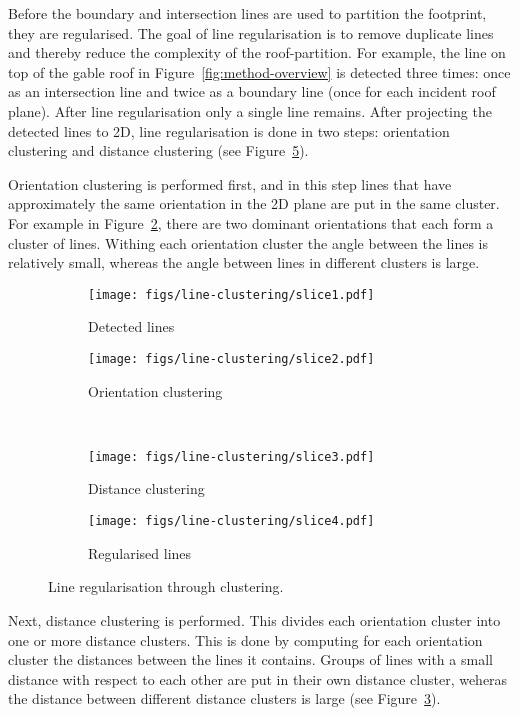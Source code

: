 Before the boundary and intersection lines are used to partition the footprint, they are regularised.
The goal of line regularisation is to remove duplicate lines and thereby reduce the complexity of the roof-partition.
For example, the line on top of the gable roof in Figure~\ref{fig:method-overview} is detected three times: once as an intersection line and twice as a boundary line (once for each incident roof plane).
After line regularisation only a single line remains.
After projecting the detected lines to 2D, line regularisation is done in two steps: orientation clustering and distance clustering (see Figure~\ref{fig:lineclust}).

Orientation clustering is performed first, and in this step lines that have approximately the same orientation in the 2D plane are put in the same cluster. For example in Figure~\ref{fig:lineclust:2}, there are two dominant orientations that each form a cluster of lines. Withing each orientation cluster the angle between the lines is relatively small, whereas the angle between lines in different clusters is large.
\begin{figure}
	\centering
	\begin{subfigure}[b]{0.48\linewidth}
		\texttt{[image: figs/line-clustering/slice1.pdf]}
		\caption{Detected lines}%
		\label{fig:lineclust:1}
	\end{subfigure}
	\quad
 	\begin{subfigure}[b]{0.48\linewidth}
		\texttt{[image: figs/line-clustering/slice2.pdf]}
		\caption{Orientation clustering}%
		\label{fig:lineclust:2}
	\end{subfigure}
\\
	\begin{subfigure}[b]{0.48\linewidth}
		\texttt{[image: figs/line-clustering/slice3.pdf]}
		\caption{Distance clustering}%
		\label{fig:lineclust:3}
	\end{subfigure}
\quad
	\begin{subfigure}[b]{0.48\linewidth}
		\texttt{[image: figs/line-clustering/slice4.pdf]}
		\caption{Regularised lines}%
		\label{fig:lineclust:4}
	\end{subfigure}	
	\caption{Line regularisation through clustering. }%
	\label{fig:lineclust}
\end{figure}

Next, distance clustering is performed.
This divides each orientation cluster into one or more distance clusters.
This is done by computing for each orientation cluster the distances between the lines it contains.
Groups of lines with a small distance with respect to each other are put in their own distance cluster, weheras the distance between different distance clusters is large (see Figure~\ref{fig:lineclust:3}).

